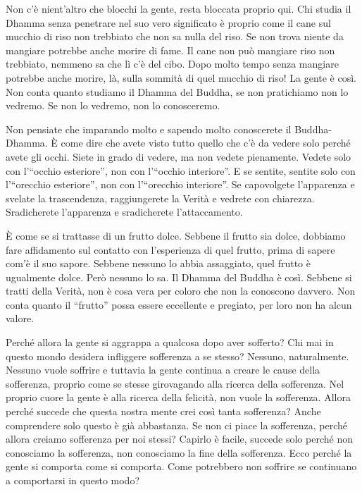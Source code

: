 Non c'è nient'altro che blocchi la gente, resta bloccata proprio qui.
Chi studia il Dhamma senza penetrare nel suo vero significato è proprio
come il cane sul mucchio di riso non trebbiato che non sa nulla del
riso. Se non trova niente da mangiare potrebbe anche morire di fame. Il
cane non può mangiare riso non trebbiato, nemmeno sa che lì c'è del
cibo. Dopo molto tempo senza mangiare potrebbe anche morire, là, sulla
sommità di quel mucchio di riso! La gente è così. Non conta quanto
studiamo il Dhamma del Buddha, se non pratichiamo non lo vedremo. Se non
lo vedremo, non lo conosceremo.

Non pensiate che imparando molto e sapendo molto conoscerete il
Buddha-Dhamma. È come dire che avete visto tutto quello che c'è da
vedere solo perché avete gli occhi. Siete in grado di vedere, ma non
vedete pienamente. Vedete solo con l'``occhio esteriore'', non con
l'``occhio interiore''. E se sentite, sentite solo con l'``orecchio
esteriore'', non con l'``orecchio interiore''. Se capovolgete
l'apparenza e svelate la trascendenza, raggiungerete la Verità e vedrete
con chiarezza. Sradicherete l'apparenza e sradicherete l'attaccamento.

È come se si trattasse di un frutto dolce. Sebbene il frutto sia dolce,
dobbiamo fare affidamento sul contatto con l'esperienza di quel frutto,
prima di sapere com'è il suo sapore. Sebbene nessuno lo abbia
assaggiato, quel frutto è ugualmente dolce. Però nessuno lo sa. Il
Dhamma del Buddha è così. Sebbene si tratti della Verità, non è cosa
vera per coloro che non la conoscono davvero. Non conta quanto il
``frutto'' possa essere eccellente e pregiato, per loro non ha alcun
valore.

Perché allora la gente si aggrappa a qualcosa dopo aver sofferto? Chi
mai in questo mondo desidera infliggere sofferenza a se stesso? Nessuno,
naturalmente. Nessuno vuole soffrire e tuttavia la gente continua a
creare le cause della sofferenza, proprio come se stesse girovagando
alla ricerca della sofferenza. Nel proprio cuore la gente è alla ricerca
della felicità, non vuole la sofferenza. Allora perché succede che
questa nostra mente crei così tanta sofferenza? Anche comprendere solo
questo è già abbastanza. Se non ci piace la sofferenza, perché allora
creiamo sofferenza per noi stessi? Capirlo è facile, succede solo perché
non conosciamo la sofferenza, non conosciamo la fine della sofferenza.
Ecco perché la gente si comporta come si comporta. Come potrebbero non
soffrire se continuano a comportarsi in questo modo?

